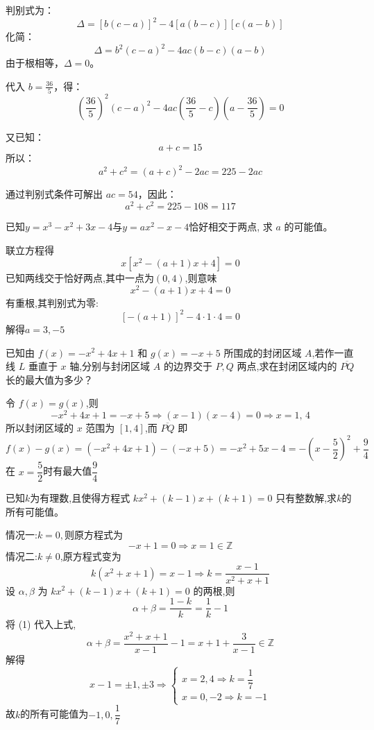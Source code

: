 \begin{questions}
\begin{solution}
判别式为：
\[
\Delta = [b(c-a)]^2 - 4[a(b-c)][c(a-b)]
\]
化简：
\[
\Delta = b^2(c-a)^2 - 4ac(b-c)(a-b)
\]
由于根相等，\(\Delta = 0\)。

代入 \( b = \frac{36}{5} \)，得：
\[
\left(\frac{36}{5}\right)^2(c-a)^2 - 4ac\left(\frac{36}{5}-c\right)(a-\frac{36}{5}) = 0
\]

又已知：
\[
a + c = 15
\]
所以：
\[
a^2 + c^2 = (a+c)^2 - 2ac = 225 - 2ac
\]

通过判别式条件可解出 \( ac = 54 \)，因此：
\[
a^2 + c^2 = 225 - 108 = 117
\]
\end{solution}

    \question 已知$y = x^3 - x^2 + 3x - 4$与$y = a x^2 - x - 4$恰好相交于两点, 求 $a$ 的可能值。 
    \begin{solution}
        联立方程得 \[ 
            x[x^2-(a+1)x+4]=0
        \]
        已知两线交于恰好两点,其中一点为$(0,4)$,则意味$$x^2-(a+1)x+4=0$$有重根,其判别式为零:$$[-(a+1)]^2-4\cdot1\cdot4=0$$解得$a=3, -5$
    \end{solution}
    
    \question 已知由 $f(x)=-x^{2}+4x+1$ 和 $g(x)=-x+5$ 所围成的封闭区域 $A$,若作一直线 $L$ 垂直于 $x$ 轴,分别与封闭区域 $A$ 的边界交于 $P,Q$ 两点,求在封闭区域内的 $\overline{PQ}$ 长的最大值为多少？
    \begin{solution}
        令 $f(x) = g(x)$,则
        \[
         -x^2 + 4x + 1 = -x + 5 \Rightarrow (x-1)(x-4) = 0 \Rightarrow x = 1,\,4
        \]
        所以封闭区域的 $x$ 范围为 $[1,4]$,而 $\overline{PQ}$ 即
        \[
        f(x) - g(x) = (-x^2 + 4x + 1) - (-x + 5) = -x^2 + 5x - 4 =-\left(x - \frac{5}{2}\right)^2 + \frac{9}{4}
        \]
        在 $x = \dfrac{5}{2}$时有最大值$\dfrac{9}{4}$
    \end{solution}

    \question 已知$k$为有理数,且使得方程式 $kx^{2}+(k-1)x+(k+1)=0$ 只有整数解,求$k$的所有可能值。
    \begin{solution}
        情况一:$k=0,$则原方程式为
        \[
        -x+1=0 \Rightarrow x=1 \in \mathbb{Z}
        \]
        情况二:$k\ne 0$,原方程式变为
        \[
        k(x^2+x+1)=x-1 \Rightarrow k=\frac{x-1}{x^2+x+1} \tag{1}
        \]
        设 $\alpha, \beta$ 为 $kx^2+(k-1)x+(k+1)=0$ 的两根,则
        \[
        \alpha+\beta = \frac{1-k}{k} = \frac{1}{k}-1 
        \]
        将 (1) 代入上式,
        \[
        \alpha+\beta = \frac{x^2+x+1}{x-1} - 1 =x+1+\frac{3}{x-1}\in \mathbb{Z}
        \]
        解得
        \[
        x-1=\pm1,\pm3
        \Rightarrow
        \begin{cases}
        x=2,4 \Rightarrow k=\dfrac{1}{7} \\
        x=0,-2 \Rightarrow k=-1
        \end{cases}
        \]
        故$k$的所有可能值为$-1,0,\dfrac{1}{7}$
    \end{solution}


\end{questions}

